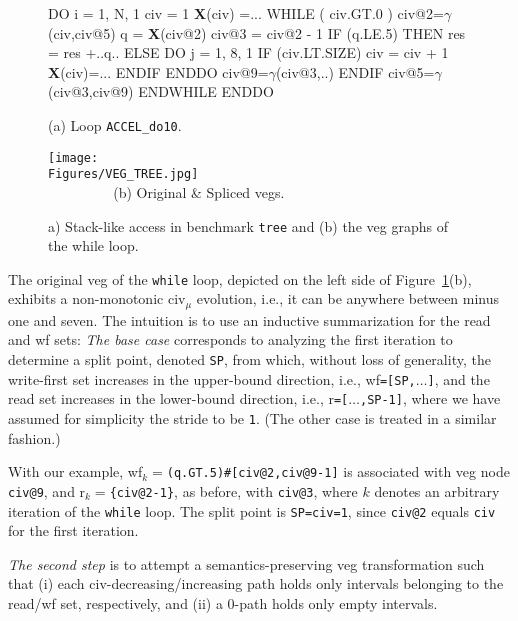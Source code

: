 \documentclass[10pt,nocopyrightspace]{sigplanconf}
\newcommand{\mymath}[1]{$ #1 $}
\newcommand{\Figures}[1]{../Figures/}
\begin{document}
\begin{figure}
\begin{minipage}{0.4\columnwidth}
\begin{colorcode}
DO i = 1, N, 1
 civ = 1
 {\bf{}X}(civ) =...
 WHILE ( civ.GT.0 )
  civ@2=\mymath{\gamma}(civ,civ@5)
  q = {\bf X}(civ@2)
  civ@3 = civ@2 - 1
  IF (q.LE.5) THEN
   res = res +..q..
  ELSE
   DO j = 1, 8, 1
    IF (civ.LT.SIZE) 
      civ = civ + 1
      {\bf{}X}(civ)=...
   ENDIF ENDDO
   civ@9=\mymath{\gamma}(civ@3,..)
  ENDIF
  civ@5=\mymath{\gamma}(civ@3,civ@9)
ENDWHILE ENDDO   
\end{colorcode}
\vspace{-1ex}
(a) Loop {\tt ACCEL\_do10}.
\end{minipage}
\begin{minipage}{0.56\columnwidth}
\texttt{[image: \\Figures/VEG\_TREE.jpg]}\\
$\mbox{ }\mbox{ }\mbox{ }\mbox{ }\mbox{ }\mbox{ }\mbox{ }$(b) Original \& Spliced {\sc veg}s.
\end{minipage}
\caption{a) Stack-like access in benchmark {\tt tree} and (b) the {\sc veg} graphs of the while loop.}
\vspace{-1ex}
\label{fig:Tree} %
\end{figure}


The original {\sc veg} of the {\tt while} loop, depicted on the left 
side of Figure~\ref{fig:Tree}(b), exhibits a non-monotonic {\sc civ}$_\mu$
evolution, i.e., it can be anywhere between minus one and seven.
%
The intuition is to use an inductive summarization for the read and {\sc wf} sets:
{\em The base case} corresponds to analyzing the first iteration to determine a split point, 
denoted {\tt SP}, from which, without loss of generality, the write-first set increases in the 
upper-bound direction, i.e., {\sc wf}{\tt=[SP,$\ldots$]}, and the read set increases 
in the lower-bound direction, i.e., {\sc r}{\tt=[$\ldots$,SP-1]}, where we 
have assumed for simplicity the stride to be {\tt 1}.
(The other case is treated in a similar fashion.)

With our example, {\sc wf}$_k=${\tt (q.GT.5)\#[civ@2,civ@9-1]}
is associated with {\sc veg} node {\tt civ@9}, and 
{\sc r}$_k=${\tt \{civ@2-1\}}, as before, with {\tt civ@3}, 
where $k$ denotes an arbitrary iteration of the {\tt while} loop.
The split point is {\tt SP=civ=1}, since {\tt civ@2} equals {\tt civ} 
for the first iteration.

{\em The second step} is to attempt a semantics-preserving {\sc veg} transformation
such that (i) each {\sc civ}-decreasing/increasing path holds only intervals 
belonging to the read/{\sc wf} set, respectively, and (ii) a $0$-path holds
only empty intervals.
\end{document}

